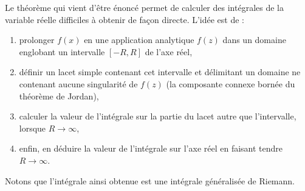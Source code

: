 Le théorème qui vient d'être énoncé permet de calculer des intégrales de la
variable réelle difficiles à obtenir de façon directe. L'idée est de :
\begin{enumerate}
    \item prolonger $f(x)$ en une application analytique $f(z)$ dans un domaine englobant un intervalle $[-R,R]$ de l'axe réel,
    \item définir un lacet simple contenant cet intervalle et délimitant un domaine ne contenant aucune singularité de $f(z)$ (la composante connexe bornée du théorème de Jordan),
    \item calculer la valeur de l'intégrale sur la partie du lacet autre que l'intervalle, lorsque $R \to \infty$,
    \item enfin, en déduire la valeur de l'intégrale sur l'axe réel en faisant tendre $R \to \infty$.
\end{enumerate}
Notons que l'intégrale ainsi obtenue est une intégrale généralisée de Riemann. 

